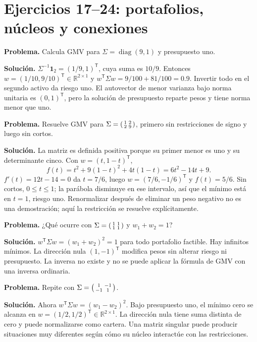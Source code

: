 \documentclass[11pt,a4paper]{article}
\newcommand{\R}{\mathbb R}
\newcommand{\T}{^{\mathsf T}}
\DeclareMathOperator{\diag}{diag}
\newcommand{\ones}{\mathbf 1}
\theoremstyle{definition}
\begin{document}
\section{Ejercicios 17--24: portafolios, núcleos y conexiones}
\begin{ejemplo}
\textbf{Problema.} Calcula GMV para $\Sigma=\diag(9,1)$ y presupuesto uno.

\textbf{Solución.} $\Sigma^{-1}\ones_2=(1/9,1)\T$, cuya suma es $10/9$. Entonces $w=(1/10,9/10)\T\in\R^{2\times1}$ y $w\T\Sigma w=9/100+81/100=0.9$. Invertir todo en el segundo activo da riesgo uno. El autovector de menor varianza bajo norma unitaria es $(0,1)\T$, pero la solución de presupuesto reparte pesos y tiene norma menor que uno.
\end{ejemplo}
\begin{ejemplo}
\textbf{Problema.} Resuelve GMV para $\Sigma=\begin{psmallmatrix}1&2\\2&9\end{psmallmatrix}$, primero sin restricciones de signo y luego sin cortos.

\textbf{Solución.} La matriz es definida positiva porque su primer menor es uno y su determinante cinco. Con $w=(t,1-t)\T$,
\[
f(t)=t^2+9(1-t)^2+4t(1-t)=6t^2-14t+9.
\]
$f'(t)=12t-14=0$ da $t=7/6$, luego $w=(7/6,-1/6)\T$ y $f(t)=5/6$. Sin cortos, $0\le t\le1$; la parábola disminuye en ese intervalo, así que el mínimo está en $t=1$, riesgo uno. Renormalizar después de eliminar un peso negativo no es una demostración; aquí la restricción se resuelve explícitamente.
\end{ejemplo}
\begin{ejemplo}
\textbf{Problema.} ¿Qué ocurre con $\Sigma=\begin{psmallmatrix}1&1\\1&1\end{psmallmatrix}$ y $w_1+w_2=1$?

\textbf{Solución.} $w\T\Sigma w=(w_1+w_2)^2=1$ para todo portafolio factible. Hay infinitos mínimos. La dirección nula $(1,-1)\T$ modifica pesos sin alterar riesgo ni presupuesto. La inversa no existe y no se puede aplicar la fórmula de GMV con una inversa ordinaria.
\end{ejemplo}
\begin{ejemplo}
\textbf{Problema.} Repite con $\Sigma=\begin{psmallmatrix}1&-1\\-1&1\end{psmallmatrix}$.

\textbf{Solución.} Ahora $w\T\Sigma w=(w_1-w_2)^2$. Bajo presupuesto uno, el mínimo cero se alcanza en $w=(1/2,1/2)\T\in\R^{2\times1}$. La dirección nula tiene suma distinta de cero y puede normalizarse como cartera. Una matriz singular puede producir situaciones muy diferentes según cómo su núcleo interactúe con las restricciones.
\end{ejemplo}
\end{document}
